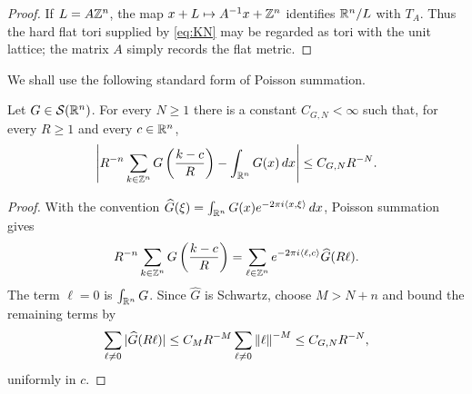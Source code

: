 \begin{proof}
If $L=A\mathbb Z^n$, the map $x+L\mapsto A^{-1}x+\mathbb Z^n$ identifies $\mathbb R^n/L$ with
$T_A$.  Thus the hard flat tori supplied by \eqref{eq:KN} may be regarded as
tori with the unit lattice; the matrix $A$ simply records the flat metric.
\end{proof}

We shall use the following standard form of Poisson summation.

\begin{lemma}\label{lem:summation}
\leanok
Let $G\in\mathcal S(\mathbb R^n)$.  For every $N\ge1$ there is a constant
$C_{G,N}<\infty$ such that, for every $R\ge1$ and every $c\in\mathbb R^n$,
\[
\left|R^{-n}\sum_{k\in\mathbb Z^n}G\left(\frac{k-c}{R}\right)
      -\int_{\mathbb R^n}G(x)\,dx\right|
\le C_{G,N}R^{-N}.
\]
\end{lemma}

\begin{proof}
With the convention
$\widehat G(\xi)=\int_{\mathbb R^n}G(x)e^{-2\pi i\left\langle x,\xi\right\rangle}\,dx$, Poisson summation
gives
\[
        R^{-n}\sum_{k\in\mathbb Z^n}G\left(\frac{k-c}{R}\right)
        =\sum_{\ell\in\mathbb Z^n}e^{-2\pi i\left\langle \ell,c\right\rangle}\widehat G(R\ell).
\]
The term $\ell=0$ is $\int_{\mathbb R^n}G$.  Since $\widehat G$ is Schwartz, choose
$M>N+n$ and bound the remaining terms by
\[
        \sum_{\ell\ne0}|\widehat G(R\ell)|
        \le C_MR^{-M}\sum_{\ell\ne0}\left\lVert \ell\right\rVert^{-M}
        \le C_{G,N}R^{-N},
\]
uniformly in $c$.
\end{proof}
